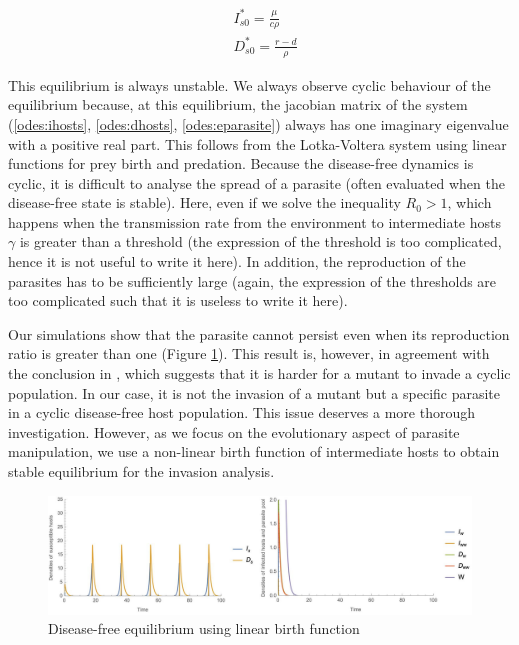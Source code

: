 \documentclass{article}
\begin{document}
\begin{align*}
& I_{s0}^* = \frac{\mu}{c \rho} \\
& D_{s0}^* = \frac{r - d}{\rho}
\end{align*}

This equilibrium is always unstable. 
We always observe cyclic behaviour of the equilibrium because, at this equilibrium, the jacobian matrix of the system (\ref{odes:ihosts}, \ref{odes:dhosts}, \ref{odes:eparasite}) always has one imaginary eigenvalue with a positive real part. 
This follows from the Lotka-Voltera system using linear functions for prey birth and predation. 
Because the disease-free dynamics is cyclic, it is difficult to analyse the spread of a parasite (often evaluated when the disease-free state is stable). 
Here, even if we solve the inequality $R_0 > 1$, which happens when the transmission rate from the environment to intermediate hosts $\gamma$ is greater than a threshold (the expression of the threshold is too complicated, hence it is not useful to write it here). 
In addition, the reproduction of the parasites has to be sufficiently large (again, the expression of the thresholds are too complicated such that it is useless to write it here).

Our simulations show that the parasite cannot persist even when its reproduction ratio is greater than one (Figure \ref{fig:diseasefree:linear}). This result is, however, in agreement with the conclusion in \citet{Ripa:Evol:2013}, which suggests that it is harder for a mutant to invade a cyclic population. 
In our case, it is not the invasion of a mutant but a specific parasite in a cyclic disease-free host population. 
This issue deserves a more thorough investigation. 
However, as we focus on the evolutionary aspect of parasite manipulation, we use a non-linear birth function of intermediate hosts to obtain stable equilibrium for the invasion analysis.

\begin{figure}
\includegraphics[width=\textwidth]{Figures/diseasefree_linear}
\caption{Disease-free equilibrium using linear birth function}
\label{fig:diseasefree:linear}
\end{figure}
\end{document}
